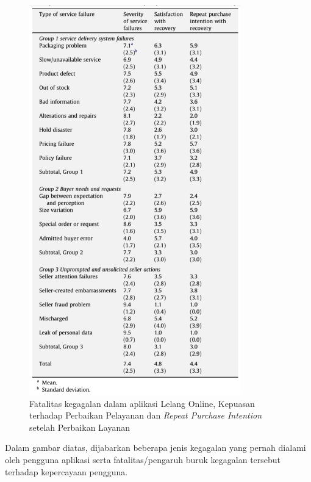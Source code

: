 	  \begin{figure}[H]
        \centering
        \includegraphics[height=.5\textheight]{images/bab3/Fatalitas-Kegagalan-Ecommerce.png}
        \caption{Fatalitas kegagalan dalam aplikasi Lelang Online, Kepuasan terhadap Perbaikan Pelayanan dan \textit{Repeat Purchase Intention} setelah Perbaikan Layanan}
        \label{severity-failures}
      \end{figure}
      
      \indent Dalam gambar diatas, dijabarkan beberapa jenis kegagalan yang pernah dialami oleh pengguna aplikasi serta fatalitas/pengaruh buruk kegagalan tersebut terhadap kepercayaan pengguna. 
      
